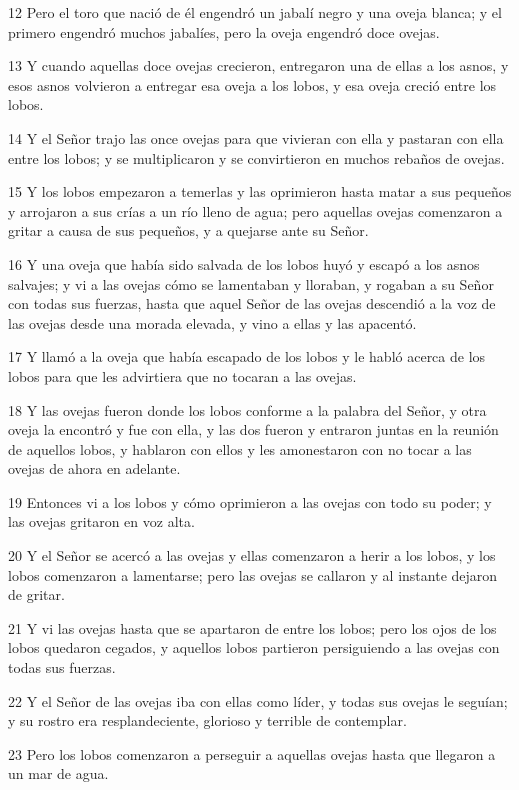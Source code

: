 \par 12 Pero el toro que nació de él engendró un jabalí negro y una oveja blanca; y el primero engendró muchos jabalíes, pero la oveja engendró doce ovejas.
\par 13 Y cuando aquellas doce ovejas crecieron, entregaron una de ellas a los asnos, y esos asnos volvieron a entregar esa oveja a los lobos, y esa oveja creció entre los lobos.
\par 14 Y el Señor trajo las once ovejas para que vivieran con ella y pastaran con ella entre los lobos; y se multiplicaron y se convirtieron en muchos rebaños de ovejas.
\par 15 Y los lobos empezaron a temerlas y las oprimieron hasta matar a sus pequeños y arrojaron a sus crías a un río lleno de agua; pero aquellas ovejas comenzaron a gritar a causa de sus pequeños, y a quejarse ante su Señor.
\par 16 Y una oveja que había sido salvada de los lobos huyó y escapó a los asnos salvajes; y vi a las ovejas cómo se lamentaban y lloraban, y rogaban a su Señor con todas sus fuerzas, hasta que aquel Señor de las ovejas descendió a la voz de las ovejas desde una morada elevada, y vino a ellas y las apacentó.
\par 17 Y llamó a la oveja que había escapado de los lobos y le habló acerca de los lobos para que les advirtiera que no tocaran a las ovejas.
\par 18 Y las ovejas fueron donde los lobos conforme a la palabra del Señor, y otra oveja la encontró y fue con ella, y las dos fueron y entraron juntas en la reunión de aquellos lobos, y hablaron con ellos y les amonestaron con no tocar a las ovejas de ahora en adelante.
\par 19 Entonces vi a los lobos y cómo oprimieron a las ovejas con todo su poder; y las ovejas gritaron en voz alta.
\par 20 Y el Señor se acercó a las ovejas y ellas comenzaron a herir a los lobos, y los lobos comenzaron a lamentarse; pero las ovejas se callaron y al instante dejaron de gritar.
\par 21 Y vi las ovejas hasta que se apartaron de entre los lobos; pero los ojos de los lobos quedaron cegados, y aquellos lobos partieron persiguiendo a las ovejas con todas sus fuerzas.
\par 22 Y el Señor de las ovejas iba con ellas como líder, y todas sus ovejas le seguían; y su rostro era resplandeciente, glorioso y terrible de contemplar.
\par 23 Pero los lobos comenzaron a perseguir a aquellas ovejas hasta que llegaron a un mar de agua.
